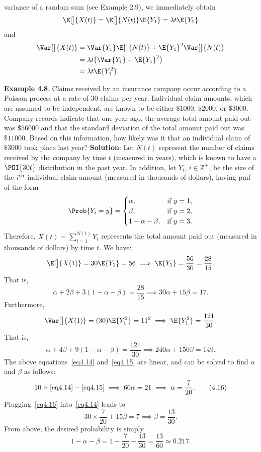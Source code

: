 \begin{Regular}
\begin{enumerate}[(1)]
              variance of a random sum (see Example 2.9), we immediately obtain
              \[ \E[\big]{X(t)}=\E[\big]{N(t)}\E{Y_1}=\lambda t\E{Y_1} \]
              and
              \begin{align*}
                  \Var[\big]{X(t)}
                   & =\Var{Y_1}\E[\big]{N(t)}+\E{Y_1}^2\Var[\big]{N(t)} \\
                   & =\lambda t\bigl(\Var{Y_1}-\E{Y_1}^2\bigr)          \\
                   & =\lambda t\E{Y_1^2}.
              \end{align*}
    \end{enumerate}
\end{Regular}
\begin{Example}
    \textbf{Example 4.8}. Claims received by an insurance company occur according to a Poisson process
    at a rate of $30$ claims per year. Individual claim amounts, which are assumed to be
    independent, are known to be either $\$1000$, $\$2000$, or $\$3000$. Company records indicate that
    one year ago, the average total amount paid out was $\$56000$ and that the standard deviation
    of the total amount paid out was $\$11000$. Based on this information, how likely was it that an
    individual claim of $\$3000$ took place last year?
    \tcblower{}
    \textbf{Solution}: Let $ N(t) $ represent the number of claims received by the company
    by time $ t $ (measured in years), which is known to have a $ \POI{30t} $
    distribution in the past year. In addition, let $ Y_i $, $ i\in\mathbb{Z}^+ $,
    be the size of the $ i\textsuperscript{th} $ individual claim amount (measured in thousands of dollars),
    having pmf of the form
    \[ \Prob{Y_i=y}=\begin{cases}
            \alpha,         & \text{if $y=1$}, \\
            \beta,          & \text{if $y=2$}, \\
            1-\alpha-\beta, & \text{if $y=3$}.
        \end{cases} \]
    Therefore, $ X(t)=\sum_{i=1}^{N(t)}Y_i $ represents the total amount paid out (measured in thousands of dollars) by time $ t $.
    We have:
    \[ \E[\big]{X(1)}=30\E{Y_1}=56\implies \E{Y_1}=\frac{56}{30}=\frac{28}{15}. \]
    That is,
    \[ \alpha+2\beta+3(1-\alpha-\beta)=\frac{28}{15}\implies 30\alpha+15\beta=17.\label{eq4.14}\tag*{(4.14)} \]
    Furthermore,
    \[ \Var[\big]{X(1)}=(30)\E{Y_1^2}=11^2\implies \E{Y_1^2}=\frac{121}{30}. \]
    That is,
    \[ \alpha+4\beta+9(1-\alpha-\beta)=\frac{121}{30}\implies 240\alpha+150\beta=149.\label{eq4.15}\tag*{(4.15)} \]
    The above equations~\ref{eq4.14} and~\ref{eq4.15} are linear, and can be solved to find $ \alpha $ and $ \beta $ as follows:
    \[ 10\times\ref{eq4.14}-\ref{eq4.15}\implies 60\alpha=21\implies \alpha=\frac{7}{20}.\label{eq4.16}\tag*{(4.16)} \]
    Plugging~\ref{eq4.16} into~\ref{eq4.14} leads to
    \[ 30\times \frac{7}{20}+15\beta=7\implies \beta=\frac{13}{30}. \]
    From above, the desired probability is simply
    \[ 1-\alpha-\beta=1-\frac{7}{20}-\frac{13}{30}=\frac{13}{60}\simeq 0.217. \]
\end{Example}